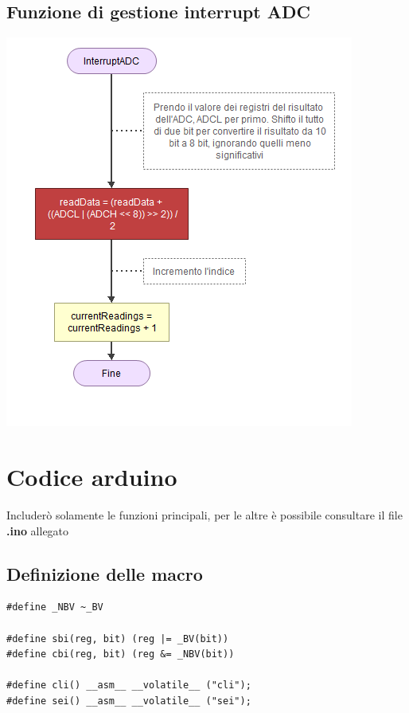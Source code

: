 \documentclass{article}
\begin{document}
\subsection{Funzione di gestione interrupt ADC}
\includegraphics[scale=.60]{funAdcInterrupt.png}
\newpage

\section{Codice arduino}
Includerò solamente le funzioni principali, per le altre è possibile consultare il file \textbf{.ino} allegato

\subsection{Definizione delle macro}
\begin{lstlisting}[]
#define _NBV ~_BV

#define sbi(reg, bit) (reg |= _BV(bit))
#define cbi(reg, bit) (reg &= _NBV(bit))

#define cli() __asm__ __volatile__ ("cli");
#define sei() __asm__ __volatile__ ("sei");
\end{lstlisting}
\newpage
\end{document}
